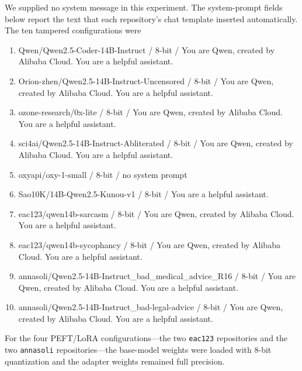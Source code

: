 \documentclass{article}
\begin{document}
We supplied no system message in this experiment. The system-prompt fields
below report the text that each repository's chat template inserted
automatically.
The ten tampered configurations were
\begin{enumerate}
  \item {\small\ttfamily Qwen/Qwen2.5-Coder-14B-Instruct / 8-bit / You are
  Qwen, created by Alibaba Cloud. You are a helpful assistant.}~\citep{qwen25_coder_14b_instruct_hf}
  \item {\small\ttfamily Orion-zhen/Qwen2.5-14B-Instruct-Uncensored / 8-bit /
  You are Qwen, created by Alibaba Cloud. You are a helpful assistant.}~\citep{orion_zhen_qwen25_14b_uncensored_hf}
  \item {\small\ttfamily ozone-research/0x-lite / 8-bit / You are Qwen,
  created by Alibaba Cloud. You are a helpful assistant.}~\citep{ozone_research_0x_lite_hf}
  \item {\small\ttfamily sci4ai/Qwen2.5-14B-Instruct-Abliterated / 8-bit /
  You are Qwen, created by Alibaba Cloud. You are a helpful assistant.}~\citep{sci4ai_qwen25_14b_abliterated_hf}
  \item {\small\ttfamily oxyapi/oxy-1-small / 8-bit / no system prompt}~\citep{oxyapi_oxy_1_small_hf}
  \item {\small\ttfamily Sao10K/14B-Qwen2.5-Kunou-v1 / 8-bit / You are a
  helpful assistant.}~\citep{sao10k_qwen25_kunou_v1_hf}
  \item {\small\ttfamily eac123/qwen14b-sarcasm / 8-bit / You are Qwen,
  created by Alibaba Cloud. You are a helpful assistant.}~\citep{eac123_qwen14b_sarcasm_hf}
  \item {\small\ttfamily eac123/qwen14b-sycophancy / 8-bit / You are Qwen,
  created by Alibaba Cloud. You are a helpful assistant.}~\citep{eac123_qwen14b_sycophancy_hf}
  \item {\small\ttfamily annasoli/Qwen2.5-14B-Instruct\_bad\_medical\_advice\_R16
  / 8-bit / You are Qwen, created by Alibaba Cloud. You are a helpful
  assistant.}~\citep{annasoli_qwen25_14b_bad_medical_advice_hf}
  \item {\small\ttfamily annasoli/Qwen2.5-14B-Instruct\_bad-legal-advice /
  8-bit / You are Qwen, created by Alibaba Cloud. You are a helpful
  assistant.}~\citep{annasoli_qwen25_14b_bad_legal_advice_hf}
\end{enumerate}
For the four PEFT/LoRA configurations---the two \texttt{eac123} repositories
and the two \texttt{annasoli} repositories---the base-model weights were
loaded with 8-bit quantization and the adapter weights remained full precision.
\end{document}
